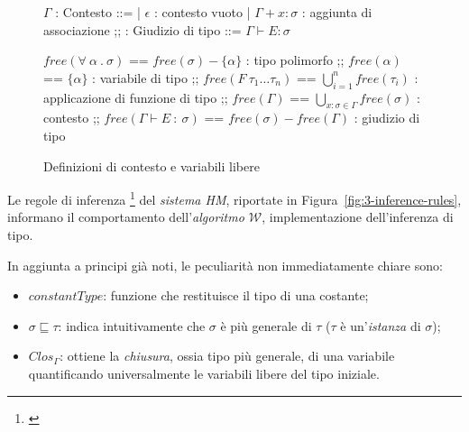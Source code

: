 \begin{figure}
    \vspace{4mm}
    \begin{bnf}
        $\Gamma$ : \small{Contesto} ::=
        | $\epsilon$ : \small{contesto vuoto}
        | $\Gamma + x \colon \sigma$ : \small{aggiunta di associazione}
        ;;
        : \small{Giudizio di tipo} ::= $\Gamma \vdash E \colon \sigma$
    \end{bnf}
    \par\vspace{12mm}
    \begin{bnf}
        $free(\forall\ \alpha\ .\ \sigma)$ == $free(\sigma) - \{\alpha\}$ : \small{tipo polimorfo}
        ;;
        $free(\alpha)$ == $\{\alpha\}$ : \small{variabile di tipo}
        ;;
        $free(F\ \tau_1\ldots\tau_n)$ == $\bigcup\limits_{i=1}^{n} free(\tau_i)$ : \small{applicazione di funzione di tipo}
        ;;
        $free(\Gamma)$ == $\bigcup\limits_{x\colon\sigma\in\Gamma} free(\sigma)$ : \small{contesto}
        ;;
        $free(\Gamma\vdash E\ \colon\ \sigma)$ == $free(\sigma) - free(\Gamma)$ : \small{giudizio di tipo}
    \end{bnf}
    \caption{Definizioni di contesto e variabili libere}
    \label{fig:3-context-free-variables}
    \vspace{4mm}
\end{figure}

\noindent Le regole di inferenza%
\footnote{ \cite{Clement-1986-MiniML}}
del \textit{sistema HM}, riportate in Figura~\ref{fig:3-inference-rules},
informano il comportamento dell'\textit{algoritmo $\mathcal{W}$}, implementazione dell'inferenza di tipo.

\newpage

\noindent In aggiunta a principi già noti, le peculiarità non immediatamente chiare sono:
\begin{itemize}
    \item $constantType$: funzione che restituisce il tipo di una costante;
    \item $\sigma \sqsubseteq \tau$: indica intuitivamente che $\sigma$ è più generale di $\tau$
          ($\tau$ è un'\textit{istanza} di $\sigma$);
    \item $Clos_\Gamma$: ottiene la \textit{chiusura}, ossia tipo più generale, di una variabile
          quantificando universalmente le variabili libere del tipo iniziale.
\end{itemize}

